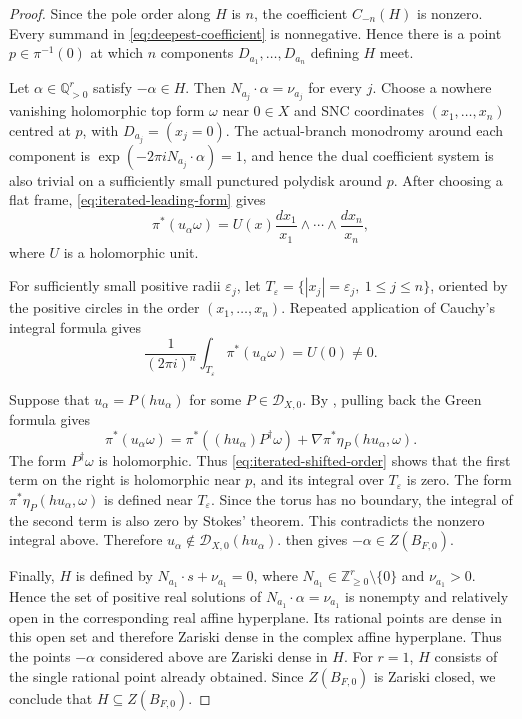 \documentclass[12pt]{amsart}
\numberwithin{equation}{section}
\theoremstyle{plain}
\theoremstyle{definition}
\theoremstyle{remark}
\theoremstyle{definition}
\newcommand{\Q}{\mathbb Q}
\newcommand{\Z}{\mathbb Z}
\newcommand{\D}{\mathscr D}
\begin{document}
\begin{proof}
Since the pole order along $H$ is $n$, the coefficient $C_{-n}(H)$ is nonzero. Every summand in \eqref{eq:deepest-coefficient} is nonnegative. Hence there is a point $p\in\pi^{-1}(0)$ at which $n$ components $D_{a_1},\ldots,D_{a_n}$ defining $H$ meet.

Let $\alpha\in\Q_{>0}^r$ satisfy $-\alpha\in H$. Then $N_{a_j}\cdot\alpha=\nu_{a_j}$ for every $j$. Choose a nowhere vanishing holomorphic top form $\omega$ near $0\in X$ and SNC coordinates $(x_1,\ldots,x_n)$ centred at $p$, with $D_{a_j}=(x_j=0)$. The actual-branch monodromy around each component is $\exp(-2\pi iN_{a_j}\cdot\alpha)=1$, and hence the dual coefficient system is also trivial on a sufficiently small punctured polydisk around $p$. After choosing a flat frame, \eqref{eq:iterated-leading-form} gives
\[
\pi^*(u_\alpha\omega) = U(x)\frac{dx_1}{x_1}\wedge\cdots\wedge\frac{dx_n}{x_n},
\]
where $U$ is a holomorphic unit.

For sufficiently small positive radii $\varepsilon_j$, let $T_\varepsilon=\{|x_j|=\varepsilon_j,\ 1\leq j\leq n\}$, oriented by the positive circles in the order $(x_1,\ldots,x_n)$. Repeated application of Cauchy's integral formula gives
\[
\frac{1}{(2\pi i)^n}\int_{T_\varepsilon}\pi^*(u_\alpha\omega) = U(0)\ne0.
\]

Suppose that $u_\alpha=P(hu_\alpha)$ for some $P\in\D_{X,0}$. By , pulling back the Green formula gives
\[
\pi^*(u_\alpha\omega) = \pi^*((hu_\alpha)P^\dagger\omega) + \nabla\pi^*\eta_P(hu_\alpha,\omega).
\]
The form $P^\dagger\omega$ is holomorphic. Thus \eqref{eq:iterated-shifted-order} shows that the first term on the right is holomorphic near $p$, and its integral over $T_\varepsilon$ is zero. The form $\pi^*\eta_P(hu_\alpha,\omega)$ is defined near $T_\varepsilon$. Since the torus has no boundary, the integral of the second term is also zero by Stokes' theorem. This contradicts the nonzero integral above. Therefore $u_\alpha\notin\D_{X,0}(hu_\alpha)$.  then gives $-\alpha\in Z(B_{F,0})$.

Finally, $H$ is defined by $N_{a_1}\cdot s+\nu_{a_1}=0$, where $N_{a_1}\in\Z_{\geq0}^r\setminus\{0\}$ and $\nu_{a_1}>0$. Hence the set of positive real solutions of $N_{a_1}\cdot\alpha=\nu_{a_1}$ is nonempty and relatively open in the corresponding real affine hyperplane. Its rational points are dense in this open set and therefore Zariski dense in the complex affine hyperplane. Thus the points $-\alpha$ considered above are Zariski dense in $H$. For $r=1$, $H$ consists of the single rational point already obtained. Since $Z(B_{F,0})$ is Zariski closed, we conclude that $H\subseteq Z(B_{F,0})$.
\end{proof}
\end{document}
